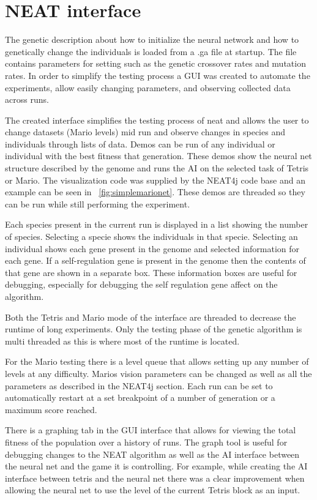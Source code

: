 \documentclass[12pt]{ucthesis} \newif\ifpdf \ifx\pdfoutput\undefined
\begin{document}
\section{NEAT interface}

The genetic description about how to initialize the neural network and how to
genetically change the individuals is loaded from a .ga file at startup. The
file contains parameters for setting such as the genetic crossover rates and
mutation rates. In order to simplify the testing process a GUI was created to
automate the experiments, allow easily changing parameters, and observing
collected data across runs.

The created interface simplifies the testing process of neat and allows the user
to change datasets (Mario levels) mid run and observe changes in species and
individuals through lists of data. Demos can be run of any individual or
individual with the best fitness that generation. These demos show the neural
net structure described by the genome and runs the AI on the selected task of
Tetris or Mario. The visualization code was supplied by the NEAT4j code base
and an example can be seen in ~\ref{fig:simplemarionet}.
These demos are threaded so they can be run while still performing the
experiment.

Each species present in the current run is displayed in a list showing the
number of species. Selecting a specie shows the individuals in that specie.
Selecting an individual shows each gene present in the genome and selected
information for each gene. If a self-regulation gene is present in the genome
then the contents of that gene are shown in a separate box. These information
boxes are useful for debugging, especially for debugging the self regulation
gene affect on the algorithm.

Both the Tetris and Mario mode of the interface are threaded to decrease the
runtime of long experiments. Only the testing phase of the genetic algorithm is
multi threaded as this is where most of the runtime is located.

For the Mario testing there is a level queue that allows setting up any number
of levels at any difficulty.  Marios vision parameters can be changed as well as
all the parameters as described in the NEAT4j section. Each run can be set to
automatically restart at a set breakpoint of a number of generation or a maximum
score reached.

There is a graphing tab in the GUI interface that allows for viewing the total
fitness of the population over a history of runs. The graph tool is useful for
debugging changes to the NEAT algorithm as well as the AI interface between the
neural net and the game it is controlling. For example, while creating the AI
interface between tetris and the neural net there was a clear improvement when
allowing the neural net to use the level of the current Tetris block as an
input. 
\end{document}
